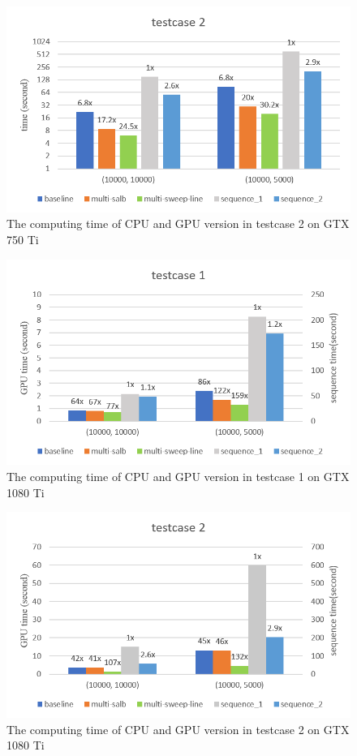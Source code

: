 \begin{figure}[h]
    \centering
    \includegraphics[scale=0.7]{image/fig_5_2}
    \caption{The computing time of CPU and GPU version in testcase 2 on GTX 750 Ti}
    \label{fig:fig_5_2}
\end{figure}

\begin{figure}[h]
    \centering
    \includegraphics[scale=0.7]{image/fig_5_3}
    \caption{The computing time of CPU and GPU version in testcase 1 on GTX 1080 Ti}
    \label{fig:fig_5_3}
\end{figure}

\begin{figure}[h]
    \centering
    \includegraphics[scale=0.7]{image/fig_5_4}
    \caption{The computing time of CPU and GPU version in testcase 2 on GTX 1080 Ti}
    \label{fig:fig_5_4}
\end{figure}

